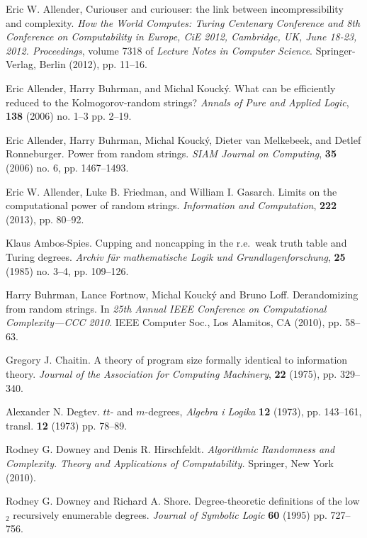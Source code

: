 \documentclass{LMCS}
\newcommand{\0}{\mathbf{0}}
\newcommand{\<}{\langle}
\renewcommand{\>}{\rangle}
\begin{document}
\begin{thebibliography}{99}

  Eric W. Allender,
  Curiouser and curiouser: the link between incompressibility and complexity.
  {\em How the World Computes: Turing Centenary Conference and
  8th Conference on Computability in Europe, CiE 2012, Cambridge,
  UK, June 18-23, 2012. Proceedings},
  volume 7318 of {\em Lecture Notes in Computer Science}.
  Springer-Verlag, Berlin (2012), pp. 11--16.

  Eric Allender, Harry Buhrman, and Michal Kouck{\'y}.
  What can be efficiently reduced to the {K}olmogorov-random strings?
  {\em Annals of Pure and Applied Logic}, {\bf 138} (2006) no. 1--3 pp. 2--19.

  Eric Allender, Harry Buhrman, Michal Kouck{\'y}, Dieter van Melkebeek, and
  Detlef Ronneburger.
  Power from random strings.
  {\em SIAM Journal on Computing}, {\bf 35} (2006) no. 6, pp. 1467--1493.

  Eric W. Allender, Luke B. Friedman, and William I. Gasarch.
  Limits on the computational power of random strings.
  {\em Information and Computation}, {\bf 222} (2013), pp. 80--92.

  Klaus Ambos-Spies.
  Cupping and noncapping in the r.e.\ weak truth table and Turing degrees.
  {\em Archiv f\"ur mathematische Logik und Grundlagenforschung},
  {\bf 25} (1985) no. 3--4, pp. 109--126.

  Harry Buhrman, Lance Fortnow, Michal Kouck{\'y} and Bruno Loff.
  Derandomizing from random strings.
  In {\em 25th {A}nnual {IEEE} {C}onference on {C}omputational
  {C}omplexity---{CCC} 2010}. IEEE Computer Soc., Los Alamitos,
  CA (2010), pp. 58--63.

  Gregory J. Chaitin.
  A theory of program size formally identical to information theory.
  {\em Journal of the Association for Computing Machinery},
  {\bf 22} (1975), pp. 329--340.

  Alexander N. Degtev.
  $tt$- and $m$-degrees,
  {\em Algebra i Logika} {\bf 12} (1973), pp. 143--161,
  transl. {\bf 12} (1973) pp. 78--89.

  Rodney G. Downey and Denis R. Hirschfeldt.
  {\em Algorithmic Randomness and Complexity.}
  {\em Theory and Applications of Computability.}
  Springer, New York (2010).

  Rodney G. Downey and Richard A. Shore.
  Degree-theoretic definitions of the low$_2$ recursively enumerable degrees.
  {\em Journal of Symbolic Logic} {\bf 60} (1995) pp. 727--756.


\end{thebibliography}
\end{document}
